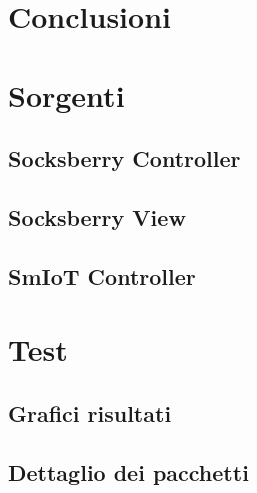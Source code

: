 \documentclass[a4paper, 12pt] {report}
\begin{document}
  \newpage
  \thispagestyle{empty}
  \mbox{}

  \chapter{Conclusioni}
    \label{ch:conclusion}
    

  \newpage
  \thispagestyle{empty}
  \mbox{}

  \appendix

  \chapter{Sorgenti}
    \section{Socksberry Controller}
      \label{app:socksberry_controller}
      
    \section{Socksberry View}
      \label{app:socksberry_view}
      
    \section{SmIoT Controller}
      \label{app:smiot_controller}
      
  \chapter{Test}
    \section{Grafici risultati}
      \label{app:chart}
      
    \section{Dettaglio dei pacchetti}
      \label{app:hexdump}
      

  \medskip
  \newrefcontext[sorting=none]
  \printbibliography[heading=bibintoc, title={Bibliografia}]
\end{document}
